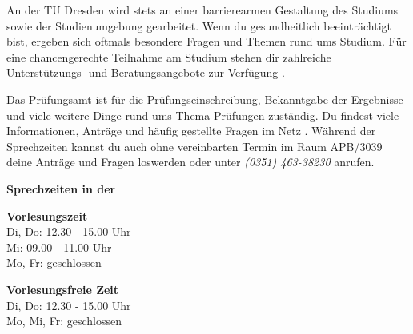 
An der TU Dresden wird stets an einer barrierearmen Gestaltung des Studiums sowie der Studienumgebung gearbeitet.
Wenn du gesundheitlich beeinträchtigt bist, ergeben sich oftmals besondere Fragen und Themen rund ums Studium. 
Für eine chancengerechte Teilnahme am Studium stehen dir zahlreiche Unterstützungs- und Beratungsangebote zur Verfügung .


\label{sec:pruefungsamt}
Das Prüfungsamt ist für die Prüfungseinschreibung, Bekanntgabe der Ergebnisse und viele weitere Dinge rund ums Thema Prüfungen zuständig. 
Du findest viele Informationen, Anträge und häufig gestellte Fragen im Netz . 
Während der Sprechzeiten kannst du auch ohne vereinbarten Termin im Raum APB/3039 deine Anträge und Fragen loswerden oder unter \textit{(0351) 463-38230} anrufen.

\textbf{Sprechzeiten in der}

\begin{multicols}{2}
\textbf{Vorlesungszeit} \\
Di, Do: 12.30 - 15.00 Uhr\\
Mi: 09.00 - 11.00 Uhr\\
Mo, Fr: geschlossen	

\textbf{Vorlesungsfreie Zeit} \\
Di, Do: 12.30 - 15.00 Uhr\\
Mo, Mi, Fr: geschlossen
\end{multicols}

